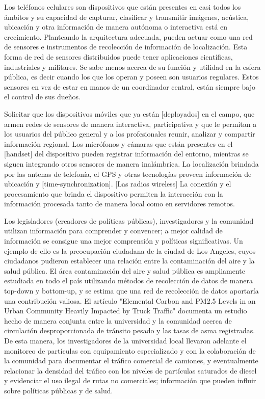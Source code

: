	Los teléfonos celulares son dispositivos que están presentes en casi todos los ámbitos y su capacidad de capturar, clasificar y transmitir imágenes, acústica, ubicación y otra información de manera autónoma o interactiva está en crecimiento.
Planteando la arquitectura adecuada, pueden actuar como una red de sensores e instrumentos de recolección de información de localización. 
Esta forma de red de sensores distribuidos puede tener aplicaciones científicas, industriales y militares. Se sabe menos acerca de su función y utilidad en la esfera pública, es decir cuando los que los operan y poseen son usuarios regulares.   Estos sensores en vez de estar en manos de un coordinador central, están siempre bajo el control de sus dueños.

	Solicitar que los dispositivos móviles que ya están [deployados] en el campo, que armen redes de sensores de manera interactiva, participativa y que le permitan a los usuarios del público general y a los profesionales reunir, analizar y compartir información regional. Los micrófonos y cámaras que están presentes en el [handset] del dispositivo pueden registrar información del entorno, mientras se siguen integrando otros sensores de manera inalámbrica. La localización brindada por las antenas de telefonía, el GPS y otras tecnologías proveen información de ubicación y [time-synchronization]. [Las radios wireless] La conexión y el procesamiento que brinda el dispositivo permiten la interacción con la información procesada tanto de manera local como en servidores remotos. 
	
	Los legisladores (creadores de políticas públicas), investigadores y la comunidad utilizan información para comprender y convencer; a mejor calidad de información se consigue una mejor comprensión y políticas significativas. Un ejemplo de ello es la preocupación ciudadana de la ciudad de Los Angeles, cuyos ciudadanos pudieron establecer una relación entre la contaminación del aire y la salud pública. El área contaminación del aire y salud pública es ampliamente estudiada en todo el país utilizando métodos de recolección de datos de manera top-down y bottom-up, y se estima que una red de recolección de datos aportaría una contribución valiosa. El artículo "Elemental Carbon and PM2.5 Levels in an Urban Community Heavily Impacted by Truck Traffic" documenta un estudio hecho de manera conjunta entre la universidad y la comunidad acerca de circulación desproporcionada de tránsito pesado y las tasas de asma registradas. De esta manera, los investigadores de la universidad local llevaron adelante el monitoreo de partículas con equipamiento especializado y con la colaboración de la comunidad para documentar el tráfico comercial de camiones, y eventualmente relacionar la densidad del tráfico con los niveles de partículas saturados de diesel y evidenciar el uso ilegal de rutas no comerciales; información que pueden influir sobre políticas públicas y de salud.
	
